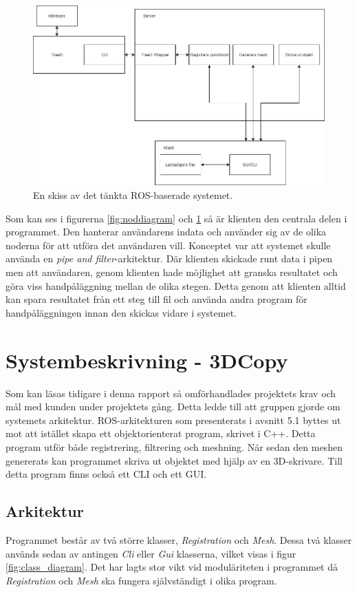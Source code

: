 \begin{figure}[H]
	\centering
	\includegraphics[width=130mm]{figures/Systemskiss_gamla.png}
	\caption{En skiss av det tänkta ROS-baserade systemet.}
	\label{fig:systembeskrivning_gamla}
\end{figure}

Som kan ses i figurerna \ref{fig:noddiagram} och \ref{fig:systembeskrivning_gamla} så är klienten den centrala delen i programmet. Den hanterar användarens indata och använder sig av de olika noderna för att utföra det användaren vill. Konceptet var att systemet skulle använda en \textit{pipe and filter}-arkitektur. Där klienten skickade runt data i pipen men att användaren, genom klienten hade möjlighet att granska resultatet och göra viss handpåläggning mellan de olika stegen. Detta genom att klienten alltid kan spara resultatet från ett steg till fil och använda andra program för handpåläggningen innan den skickas vidare i systemet.

\section{Systembeskrivning - 3DCopy}

Som kan läsas tidigare i denna rapport så omförhandlades projektets krav och mål med kunden under projektets gång. Detta ledde till att gruppen gjorde om systemets arkitektur. ROS-arkitekturen som presenterats i avsnitt 5.1 byttes ut mot att istället skapa ett objektorienterat program, skrivet i C++. Detta program utför både registrering, filtrering och meshning. När sedan den meshen genererats kan programmet skriva ut objektet med hjälp av en 3D-skrivare. Till detta program finns också ett CLI och ett GUI.

\subsection{Arkitektur}
Programmet består av två större klasser, \textit{Registration} och \textit{Mesh}. Dessa två klasser används sedan av antingen \textit{Cli}  eller \textit{Gui} klasserna, vilket visas i figur \ref{fig:class_diagram}.  Det har lagts stor vikt vid moduläriteten i programmet då \textit{Registration} och \textit{Mesh} ska fungera självständigt i olika program.

